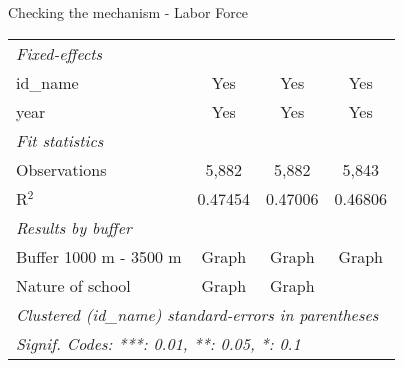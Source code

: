 \documentclass[9pt]{beamer}
\begin{document}
\begin{frame}{Checking the mechanism - Labor Force}
\begin{center}
\begin{tabular}{lccc}
   \midrule
   \emph{Fixed-effects}\\
   id\_name     & Yes             & Yes             & Yes\\  
   year         & Yes             & Yes             & Yes\\  
   \midrule
   \emph{Fit statistics}\\
   Observations & 5,882           & 5,882           & 5,843\\  
   R$^2$        & 0.47454         & 0.47006         & 0.46806\\  
   \midrule
   \emph{Results by buffer}\\
   Buffer 1000 m - 3500 m  &  Graph\hyperlink{10p_labor_buf}{\beamerbutton{ !}}            &  Graph\hyperlink{50p_labor_buf}{\beamerbutton{ !}}             &  Graph\hyperlink{100p_labor_buf}{\beamerbutton{ !}}   \\  
    Nature of school &  Graph\hyperlink{10p_labor_nat}{\beamerbutton{ !}}            &  Graph\hyperlink{50p_labor_nat}{\beamerbutton{ !}}             &    \\   
   \midrule  
   \multicolumn{4}{l}{\emph{Clustered (id\_name) standard-errors in parentheses}}\\
   \multicolumn{4}{l}{\emph{Signif. Codes: ***: 0.01, **: 0.05, *: 0.1}}\\
   \midrule
\end{tabular}
  \end{center}
\end{frame}
 
\end{document}
